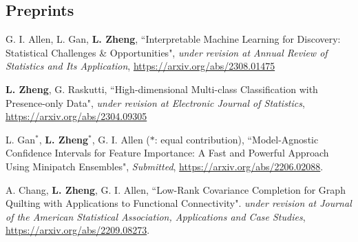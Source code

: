 \documentclass[letterpaper,11pt]{article}
\begin{document}
	\subsection*{Preprints}
	\begin{etaremune}[start=13]
		\item G. I. Allen, L. Gan, {\bf L. Zheng}, ``Interpretable Machine Learning for Discovery: Statistical Challenges \& Opportunities", {\em under revision at Annual Review of Statistics and Its Application}, \href{https://arxiv.org/abs/2308.01475}{https://arxiv.org/abs/2308.01475}
		\item {\bf L. Zheng}, G. Raskutti, ``High-dimensional Multi-class Classification with Presence-only Data", {\em under revision at Electronic Journal of Statistics},  \href{https://arxiv.org/abs/2304.09305}{https://arxiv.org/abs/2304.09305}
		\item L. Gan$^{*}$, {\bf L. Zheng}$^{*}$, G. I. Allen ($*$: equal contribution), ``Model-Agnostic Confidence Intervals for Feature Importance: A Fast and Powerful Approach Using Minipatch Ensembles", {\em Submitted},  \href{https://arxiv.org/abs/2206.02088}{https://arxiv.org/abs/2206.02088}.
		\item A. Chang, {\bf L. Zheng}, G. I. Allen, ``Low-Rank Covariance Completion for Graph Quilting with Applications to Functional Connectivity". {\em under revision at Journal of the American Statistical Association, Applications and Case Studies}, \href{https://arxiv.org/abs/2209.08273}{https://arxiv.org/abs/2209.08273}.
	\end{etaremune}
\end{document}
